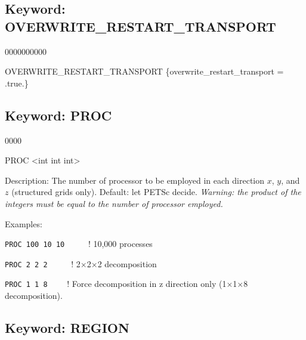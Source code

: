 \documentclass[12pt]{article}
\begin{document}
\newpage
\protect\hypertarget{target_overwrite}{}

\subsection{Keyword: OVERWRITE\_RESTART\_TRANSPORT}
\begin{deflist}{0000000000}
\item[OVERWRITE\_RESTART\_TRANSPORT] \{overwrite\_restart\_transport = .true.\}
\end{deflist}


\newpage
\protect\hypertarget{target_proc}{}

\subsection{Keyword: PROC}

\begin{deflist}{0000}
\item[PROC] <int int int> 
\item[Description:] The number of processor to be employed in each direction $x$, $y$, and $z$ (structured grids only). Default: let PETSc decide. {\em Warning: the product of the integers must be equal to the number of processor employed.}
\item[Examples:] ~

{\tt PROC 100 10 10} \ \ \ \ \ ! 10,000 processes

{\tt PROC 2 2 2} \ \ \ \ \ ! 2$\times$2$\times$2 decomposition

{\tt PROC 1 1 8} \ \ \ \ ! Force decomposition in z direction only (1$\times$1$\times$8 decomposition).
\end{deflist}


\newpage
\protect\hypertarget{target_region}{}


\subsection{Keyword: REGION}
\end{document}
